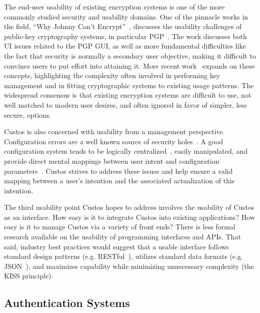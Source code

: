 The end-user usability of existing encryption systems is one of the
more commonly studied security and usability domains. One of the
pinnacle works in the field, ``Why Johnny Can't
Encrypt''~\cite{Whitten1998, Whitten1998}, discusses the usability
challenges of public-key cryptography systems, in particular
PGP~\cite{openpgp}. The work discusses both UI issues related to the
PGP GUI, as well as more fundamental difficulties like the fact that
security is normally a secondary user objective, making it difficult
to convince users to put effort into attaining it. More recent
work~\cite{Sweikata2009, Furnell2006, Ibrahim2010} expands on these
concepts, highlighting the complexity often involved in performing key
management and in fitting cryptographic systems to existing usage
patterns. The widespread consensus is that existing encryption systems
are difficult to use, not well matched to modern user desires, and
often ignored in favor of simpler, less secure, options.

Custos is also concerned with usability from a management
perspective. Configuration errors are a well known source of security
holes~\cite{Bishop1996, kerravala2002configuration}. A good
configuration system tends to be logically
centralized~\cite{Casado2007}, easily manipulated, and provide direct
mental mappings between user intent and configuration
parameters~\cite{norman2002design}. Custos strives to address these
issues and help ensure a valid mapping between a user's intention and
the associated actualization of this intention.

The third usability point Custos hopes to address involves the
usability of Custos as an interface. How easy is it to integrate
Custos into existing applications? How easy is it to manage Custos via
a variety of front ends? There is less formal research available on
the usability of programming interfaces and APIs. That said, industry
best practices would suggest that a usable interface follows standard
design patterns (e.g. RESTful~\cite{ibm-restful}), utilizes standard
data formats (e.g. JSON~\cite{json}), and maximizes capability while
minimizing unnecessary complexity (the KISS principle).

\subsection{Authentication Systems}

